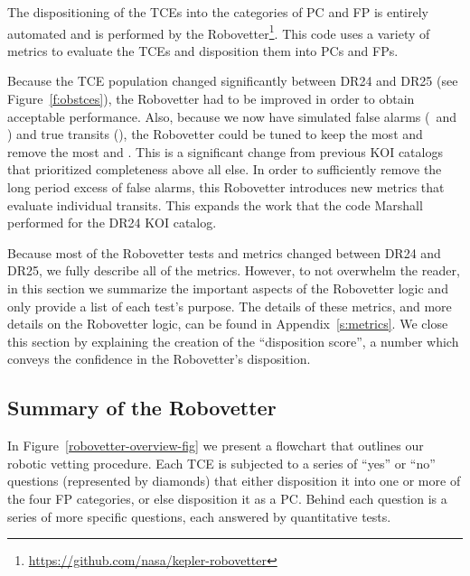 \label{s:robovetter}
The dispositioning of the TCEs into the categories of PC and FP is entirely automated and is performed by the Robovetter\footnote{\label{rvgithub}\url{https://github.com/nasa/kepler-robovetter}}. This code uses a variety of metrics to evaluate the TCEs and disposition them into PCs and FPs.  


Because the TCE population changed significantly between DR24 and DR25 (see Figure~\ref{f:obstces}), the Robovetter had to be improved in order to obtain acceptable performance.  Also, because we now have simulated false alarms (\invtces\ and \scrtces) and true transits (\injtces), the Robovetter could be tuned to keep the most  and remove the most  and . This is a significant change from previous KOI catalogs that prioritized completeness above all else.  In order to sufficiently remove the long period excess of false alarms, this Robovetter introduces new metrics that evaluate individual transits. This expands the work that the code Marshall \citep{Mullally2016} performed for the DR24 KOI catalog.

Because most of the Robovetter tests and metrics changed between DR24 and DR25, we fully describe all of the metrics.  However, to not overwhelm the reader, in this section we summarize the important aspects of the Robovetter logic and only provide a list of each test's purpose. The details of these metrics, and more details on the Robovetter logic, can be found in Appendix~\ref{s:metrics}. We close this section by explaining the creation of the ``disposition score'', a number which conveys the confidence in the Robovetter's disposition.

\subsection{Summary of the Robovetter}

In Figure~\ref{robovetter-overview-fig} we present a flowchart that outlines our robotic vetting procedure. Each TCE is subjected to a series of ``yes'' or ``no'' questions (represented by diamonds) that either disposition it into one or more of the four FP categories, or else disposition it as a PC. Behind each question is a series of more specific questions, each answered by quantitative tests. 


